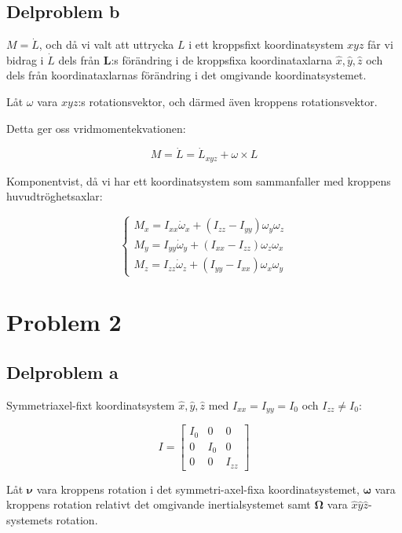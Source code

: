 \documentclass[12pt,a4paper]{article}
\begin{document}
	\subsection{Delproblem b}
	$M = \dot{L}$, och då vi valt att uttrycka $L$ i ett kroppsfixt koordinatsystem $xyz$ får vi
	bidrag i $\dot{L}$ dels från $\mathbf{L}$:s förändring i de kroppsfixa koordinataxlarna
	$\hat{x},\hat{y},\hat{z}$ och dels från koordinataxlarnas förändring i det omgivande
	koordinatsystemet.
	
	Låt $\omega$ vara $xyz$:s rotationsvektor, och därmed även kroppens rotationsvektor.
	
	Detta ger oss vridmomentekvationen:
	
	\begin{equation*}
		M = \dot{L} = \dot{L}_{xyz} + \omega \times L
	\end{equation*}
	
	
	Komponentvist, då vi har ett koordinatsystem som sammanfaller med kroppens huvudtröghetsaxlar:
	
	\begin{equation}
		\begin{cases}
			M_x = I_{xx}\dot{\omega}_x + (I_{zz} - I_{yy})\omega_y\omega_z \\
			M_y = I_{yy}\dot{\omega}_y + (I_{xx} - I_{zz})\omega_z\omega_x \\
			M_z = I_{zz}\dot{\omega}_z + (I_{yy} - I_{xx})\omega_x\omega_y
		\end{cases}
		\label{vridmomentsekvationerna_komponentvis}
	\end{equation}
	
\section{Problem 2}
	\subsection{Delproblem a}
	Symmetriaxel-fixt koordinatsystem $\hat{x},\hat{y},\hat{z}$ med $I_{xx} = I_{yy} = I_0$ och $I_{zz} \neq I_0$:
	
	\begin{equation*}
		I = \begin{bmatrix}
			I_0 & 0 & 0 \\
			0 & I_0 & 0 \\
			0 & 0 & I_{zz}
		\end{bmatrix}
	\end{equation*}
	
	Låt $\boldsymbol{\nu}$ vara kroppens rotation i det symmetri-axel-fixa koordinatsystemet,
	$\boldsymbol{\omega}$ vara kroppens rotation relativt det omgivande inertialsystemet samt $\mathbf{\Omega}$ vara
	$\hat{x}\hat{y}\hat{z}$-systemets rotation.
	
\end{document}

